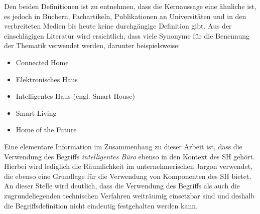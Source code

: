     Den beiden Definitionen ist zu entnehmen, dass die Kernaussage eine ähnliche ist, es jedoch in Büchern, Fachartikeln, 
    Publikationen an Universitäten und in den verbreiteten Medien bis heute keine durchgängige Definition gibt. Aus der
    einschlägigen Literatur wird ersichtlich, dass viele Synonyme für die Benennung der Thematik verwendet werden, darunter 
    beispielsweise: \cite{strese.2010m}
    \begin{itemize}
        \item Connected Home
        \item Elektronisches Haus
        \item Intelligentes Haus (engl. Smart House)
        \item Smart Living
        \item Home of the Future 
    \end{itemize}
    Eine elementare Information im Zusammenhang zu dieser Arbeit ist, dass die Verwendung des Begriffs \textit{intelligentes Büro} 
    ebenso in den Kontext des \acl{SH} gehört. Hierbei wird lediglich die Räumlichkeit im unternehmerischen Jargon verwendet, 
    die ebenso eine Grundlage für die Verwendung von Komponenten des \acl{SH} bietet. 
    \\
    An dieser Stelle wird deutlich, dass die Verwendung des Begriffs als auch die zugrundeliegenden technischen Verfahren 
    weiträumig einsetzbar sind und deshalb die Begriffsdefinition nicht eindeutig festgehalten werden kann. 
    

